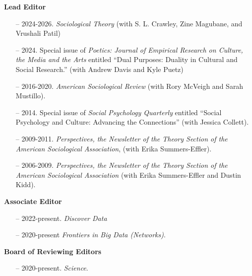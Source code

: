 
\noindent\textbf{Lead Editor}

\begin{itemize}[itemsep=-0.5ex]
    \item[--] 2024-2026. {\em Sociological Theory} (with S. L. Crawley, Zine Magubane, and Vrushali Patil)
    \item[--] 2024. Special issue of {\em Poetics: Journal of Empirical Research on Culture, the Media and the Arts} entitled ``Dual Purposes: Duality in Cultural and Social Research.'' (with Andrew Davis and Kyle Puetz)
    \item[--] 2016-2020. {\em American Sociological Review} (with Rory McVeigh and Sarah Mustillo).
    \item[--] 2014. Special issue of {\em Social Psychology Quarterly} entitled ``Social Psychology and Culture: Advancing the Connections'' (with Jessica Collett).
    \item[--] 2009-2011. \emph{Perspectives, the Newsletter of the Theory Section of the  American Sociological Association}, (with Erika Summers-Effler). 
    \item[--] 2006-2009. \emph{Perspectives, the Newsletter of the Theory Section of the  American Sociological Association} (with Erika Summers-Effler and Dustin Kidd). 
\end{itemize}

\noindent\textbf{Associate Editor} 
\begin{itemize}[itemsep=-0.5ex]
    \item[--] 2022-present. {\em Discover Data}
    \item[--] 2020-present {\em Frontiers in Big Data (Networks)}.
\end{itemize}

\noindent\textbf{Board of Reviewing Editors} 
\begin{itemize}[itemsep=-0.5ex]
    \item[--] 2020-present. {\em Science}.
\end{itemize}

